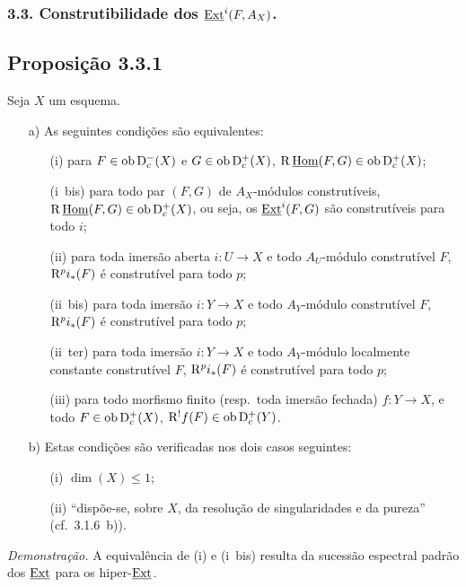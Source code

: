 \subsubsection*{3.3. Construtibilidade dos $\underline{\operatorname{Ext}}^i(F, A_X)$.}

\subsection*{Proposição 3.3.1}
Seja $X$ um esquema.
\begin{enumerate}
\item[a)] As seguintes condições são equivalentes:
\begin{enumerate}
\item[(i)] para $F \in \operatorname{ob} \mathrm{D}_c^{-}(X)$ e $G \in \operatorname{ob} \mathrm{D}_c^{+}(X)$, $\mathrm{R}\,\underline{\operatorname{Hom}}(F,G) \in \operatorname{ob} \mathrm{D}_c^{+}(X)$;
\item[(i~bis)] para todo par $(F,G)$ de $A_X$-módulos construtíveis, $\mathrm{R}\,\underline{\operatorname{Hom}}(F,G) \in \operatorname{ob} \mathrm{D}_c^{+}(X)$, ou seja, os $\underline{\operatorname{Ext}}^i(F,G)$ são construtíveis para todo $i$;
\item[(ii)] para toda imersão aberta $i : U \to X$ e todo $A_U$-módulo construtível $F$, $\mathrm{R}^p i_{*}(F)$ é construtível para todo $p$;
\item[(ii~bis)] para toda imersão $i : Y \to X$ e todo $A_Y$-módulo construtível $F$, $\mathrm{R}^p i_{*}(F)$ é construtível para todo $p$;
\item[(ii~ter)] para toda imersão $i : Y \to X$ e todo $A_Y$-módulo localmente constante construtível $F$, $\mathrm{R}^p i_{*}(F)$ é construtível para todo $p$;
\item[(iii)] para todo morfismo finito (resp.~toda imersão fechada) $f : Y \to X$, e todo $F \in \operatorname{ob} \mathrm{D}_c^{+}(X)$, $\mathrm{R}^{!}f(F) \in \operatorname{ob} \mathrm{D}_c^{+}(Y)$.
\end{enumerate}
\item[b)] Estas condições são verificadas nos dois casos seguintes:
\begin{enumerate}
\item[(i)] $\dim(X) \leqslant 1$;
\item[(ii)] \textquotedblleft dispõe-se, sobre $X$, da resolução de singularidades e da pureza\textquotedblright{} (cf.~3.1.6~b)).
\end{enumerate}
\end{enumerate}

\emph{Demonstração.} A equivalência de (i) e (i~bis) resulta da sucessão espectral padrão dos $\underline{\operatorname{Ext}}$ para os hiper-$\underline{\operatorname{Ext}}$.

